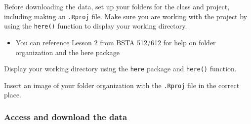 \documentclass[
  letterpaper,
  DIV=11,
  numbers=noendperiod]{scrartcl}
\providecommand{\tightlist}{%
  \setlength{\itemsep}{0pt}\setlength{\parskip}{0pt}}
\begin{document}
Before downloading the data, set up your folders for the class and
project, including making an \texttt{.Rproj} file. Make sure you are
working with the project by using the \texttt{here()} function to
display your working directory.

\begin{itemize}
\tightlist
\item
  You can reference
  \href{https://nwakim.github.io/BSTA_512_W25/schedule.html}{Lesson 2
  from BSTA 512/612} for help on folder organization and the here
  package
\end{itemize}

\begin{tcolorbox}[enhanced jigsaw, toptitle=1mm, toprule=.15mm, leftrule=.75mm, bottomtitle=1mm, breakable, opacityback=0, titlerule=0mm, title=\textcolor{quarto-callout-important-color}{\faExclamation}\hspace{0.5em}{Task}, arc=.35mm, colback=white, rightrule=.15mm, left=2mm, colbacktitle=quarto-callout-important-color!10!white, coltitle=black, opacitybacktitle=0.6, colframe=quarto-callout-important-color-frame, bottomrule=.15mm]

Display your working directory using the \texttt{here} package and
\texttt{here()} function.

Insert an image of your folder organization with the \texttt{.Rproj}
file in the correct place.

\end{tcolorbox}

\subsubsection{Access and download the
data}\label{access-and-download-the-data}
\end{document}
